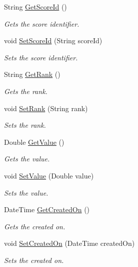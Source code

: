 \begin{DoxyCompactItemize}
String \hyperlink{classcom_1_1shephertz_1_1app42_1_1paas_1_1sdk_1_1csharp_1_1game_1_1_game_1_1_score_ae611eac151a5c7a49b61943203ddbbdd}{Get\+Score\+Id} ()
\begin{DoxyCompactList}\small\item\em Gets the score identifier. \end{DoxyCompactList}\item 
void \hyperlink{classcom_1_1shephertz_1_1app42_1_1paas_1_1sdk_1_1csharp_1_1game_1_1_game_1_1_score_a16a104e2d000311aa8047044caa6ae10}{Set\+Score\+Id} (String score\+Id)
\begin{DoxyCompactList}\small\item\em Sets the score identifier. \end{DoxyCompactList}\item 
String \hyperlink{classcom_1_1shephertz_1_1app42_1_1paas_1_1sdk_1_1csharp_1_1game_1_1_game_1_1_score_aa9f53fed02e7171d2cf4ff40493ec290}{Get\+Rank} ()
\begin{DoxyCompactList}\small\item\em Gets the rank. \end{DoxyCompactList}\item 
void \hyperlink{classcom_1_1shephertz_1_1app42_1_1paas_1_1sdk_1_1csharp_1_1game_1_1_game_1_1_score_a752770ecac9070bbd84872e936696322}{Set\+Rank} (String rank)
\begin{DoxyCompactList}\small\item\em Sets the rank. \end{DoxyCompactList}\item 
Double \hyperlink{classcom_1_1shephertz_1_1app42_1_1paas_1_1sdk_1_1csharp_1_1game_1_1_game_1_1_score_a149211c4961bc6aa06cb0c4fa9d2b78c}{Get\+Value} ()
\begin{DoxyCompactList}\small\item\em Gets the value. \end{DoxyCompactList}\item 
void \hyperlink{classcom_1_1shephertz_1_1app42_1_1paas_1_1sdk_1_1csharp_1_1game_1_1_game_1_1_score_a0f46d7e29e763021c0e0ab8e8cd96da4}{Set\+Value} (Double value)
\begin{DoxyCompactList}\small\item\em Sets the value. \end{DoxyCompactList}\item 
Date\+Time \hyperlink{classcom_1_1shephertz_1_1app42_1_1paas_1_1sdk_1_1csharp_1_1game_1_1_game_1_1_score_a00ef66046fe10733318a56e2be8a9ade}{Get\+Created\+On} ()
\begin{DoxyCompactList}\small\item\em Gets the created on. \end{DoxyCompactList}\item 
void \hyperlink{classcom_1_1shephertz_1_1app42_1_1paas_1_1sdk_1_1csharp_1_1game_1_1_game_1_1_score_a83155d9220f56c3bd0f10be2d3791a2d}{Set\+Created\+On} (Date\+Time created\+On)
\begin{DoxyCompactList}\small\item\em Sets the created on. \end{DoxyCompactList}\end{DoxyCompactItemize}
